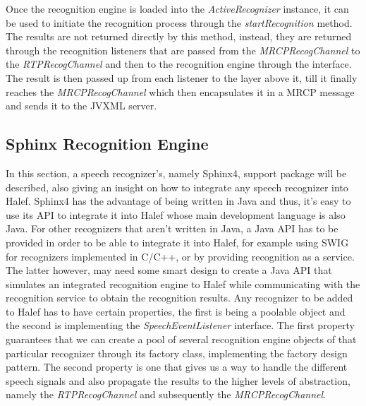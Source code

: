Once the recognition engine is loaded into the \textit{ActiveRecognizer} instance, it can be used to initiate the recognition process through the \textit{startRecognition} method.
The results are not returned directly by this method, instead, they are returned through the recognition listeners that are passed from the \textit{MRCPRecogChannel} to the \textit{RTPRecogChannel} and then to the recognition engine through the interface.
The result is then passed up from each listener to the layer above it, till it finally reaches the \textit{MRCPRecogChannel} which then encapsulates it in a MRCP message and sends it to the JVXML server.

\subsection{Sphinx Recognition Engine}
In this section, a speech recognizer's, namely Sphinx4,  support package will be described, also giving an insight on how to integrate any speech recognizer into Halef.
Sphinx4 has the advantage of being written in Java and thus, it's easy to use its API to integrate it into Halef whose main development language is also Java.
For other recognizers that aren't written in Java, a Java API has to be provided in order to be able to integrate it into Halef, for example using SWIG for recognizers implemented in C/C++, or by providing recognition as a service.
The latter however, may need some smart design to create a Java API that simulates an integrated recognition engine to Halef while communicating with the recognition service to obtain the recognition results.
Any recognizer to be added to Halef has to have certain properties, the first is being a poolable object and the second is implementing the \textit{SpeechEventListener} interface.
The first property guarantees that we can create a pool of several recognition engine objects of that particular recognizer through its factory class, implementing the factory design pattern.
The second property is one that gives us a way to handle the different speech signals and also propagate the results to the higher levels of abstraction, namely the \textit{RTPRecogChannel} and subsequently the \textit{MRCPRecogChannel}.

